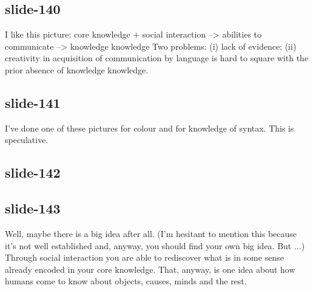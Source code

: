 \documentclass[12pt,\papersize]{extarticle}
\begin{document}
 
\subsection{slide-140}
I like this picture:
core knowledge + social interaction --> abilities to communicate --> knowledge knowledge
Two problems: (i) lack of evidence; (ii) creativity in acquisition of communication by language is hard to square with the prior absence of knowledge knowledge.
 
 
\subsection{slide-141}
I've done one of these pictures for colour and for knowledge of syntax.
This is speculative.
 
 
\subsection{slide-142}
 
 
\subsection{slide-143}
Well, maybe there is a big idea after all.
(I'm hesitant to mention this because it's not well established and, anyway, you should find your own big idea. But ...)
Through social interaction you are able to rediscover what is in some sense already encoded in your core knowledge.
That, anyway, is one idea about how humans come to know about objects, causes, minds and the rest.




 






\end{document}
